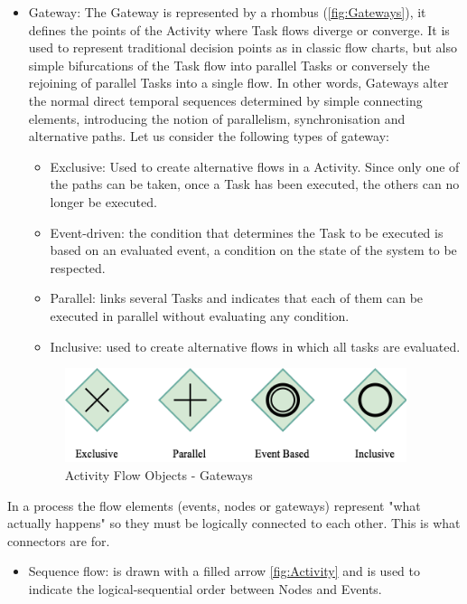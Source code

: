 \begin{itemize}
    \item Gateway: The Gateway is represented by a rhombus (\autoref{fig:Gateways}), it defines the points of the Activity where Task flows diverge or converge. It is used to represent traditional decision points as in classic flow charts, but also simple bifurcations of the Task flow into parallel Tasks or conversely the rejoining of parallel Tasks into a single flow. In other words, Gateways alter the normal direct temporal sequences determined by simple connecting elements, introducing the notion of parallelism, synchronisation and alternative paths. Let us consider the following types of gateway:
    \begin{itemize}
        \item Exclusive: Used to create alternative flows in a Activity. Since only one of the paths can be taken, once a Task has been executed, the others can no longer be executed.
        \item Event-driven: the condition that determines the Task to be executed is based on an evaluated event, a condition on the state of the system to be respected.
        \item Parallel: links several Tasks and indicates that each of them can be executed in parallel without evaluating any condition.
        \item Inclusive: used to create alternative flows in which all tasks are evaluated.
    \end{itemize}
    \begin{figure}[h]
	\centering
	\includegraphics[width=10cm]{Figures/Conceptual Model/Gateways.png}
	\caption{Activity Flow Objects - Gateways}
	\label{fig:Gateways}
    \end{figure}
    
\end{itemize}
In a process the flow elements (events, nodes or gateways) represent "what actually happens" so they must be logically connected to each other. This is what connectors are for. 

\begin{itemize}
    \item Sequence flow: is drawn with a filled arrow \autoref{fig:Activity} and is used to indicate the logical-sequential order between Nodes and Events. 
\end{itemize}
